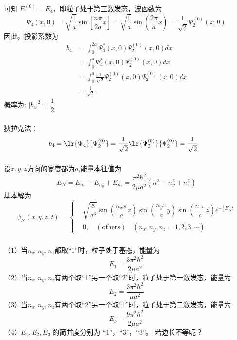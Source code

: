   \begin{frame}
    \frametitle{}
    可知 $ E^{(0)}= E_4 $，即粒子处于第三激发态，波函数为
    $$
    \Psi_4(x,0)=\sqrt{\dfrac{1}{a}} \sin[\dfrac{n\pi}{2a}x ]=\sqrt{\dfrac{1}{a}}\sin(\dfrac{2\pi}{a}x) = \frac{1}{\sqrt{2}} \Psi^{(0)}_2(x,0)
    $$
    因此，投影系数为 
    \[ 
    \begin{aligned}
      b_4 &= \int_0^{2a} \Psi^{*}_4(x,0) \Psi^{(0)}_2(x,0) dx \\ 
          &= \int_0^{a} \Psi^{*}_4(x,0) \Psi^{(0)}_2(x,0) dx \\
          &= \int_0^{a} \frac{1}{\sqrt{2}} \Psi^{(0)}_2(x,0) \Psi^{(0)}_2(x,0) dx \\
          &= \frac{1}{\sqrt{2}}
    \end{aligned}  
    \]
    概率为: $|b_4|^2 = \dfrac{1}{2}$
  \end{frame} 
  \begin{frame}[label=current]
    \frametitle{}
  狄拉克法：
  \[ 
    \begin{aligned}
      b_4 &= \lr{\Psi_4}{\Psi^{(0)}_2} = \frac{1}{\sqrt{2}} \lr{\Psi^{(0)}_2}{\Psi^{(0)}_2} = \frac{1}{\sqrt{2}}
    \end{aligned}  
    \]
  \end{frame} 

\begin{frame}
  \frametitle{}
  \解 设$x,y,z$方向的宽度都为$a$,能量本征值为
\[E_{N} = E_{n_x} +E_{n_y} + E_{n_z} = \dfrac{\pi^2\hbar^2}{2\mu a^2} (n_x^2 + n_y^2 + n_z^2) \]
基本解为
\[ \boxed{ \psi _N (x,y,z,t)=\left\{
\begin{aligned}
    & \sqrt{\dfrac{8}{a^3}}\sin(\dfrac{n_x\pi}{a}x)\sin(\dfrac{n_y\pi}{a}y) \sin(\dfrac{n_z\pi}{a}z)e^{-\frac{i}{\hbar}E_{N} t} \\ 
    & 0, \quad  ( \text{others}) \quad (n_x, n_y, n_z = 1, 2, 3, \cdots )
\end{aligned} \right.}
\]
\end{frame} 

\begin{frame}
  \frametitle{}
（1）当$n_x, n_y, n_z$都取“1”时，粒子处于基态，能量为 
\[E_{1} = \dfrac{3\pi^2\hbar^2}{2\mu a^2} \]
（2）当$n_x, n_y, n_z$有两个取“1”另一个取“2”时，粒子处于第一激发态，能量为
\[E_{2} = \dfrac{3\pi^2\hbar^2}{\mu a^2} \]
（3）当$n_x, n_y, n_z$有两个取“2”另一个取“1”时，粒子处于第二激发态，能量为
\[E_{3} = \dfrac{9\pi^2\hbar^2}{2\mu a^2} \]
（4）$ E_{1}, E_{2}, E_{3}$ 的简并度分别为 “1”，“3”，“3”。 \hspace{3em} {\color{red} 若边长不等呢？} 
\end{frame} 

